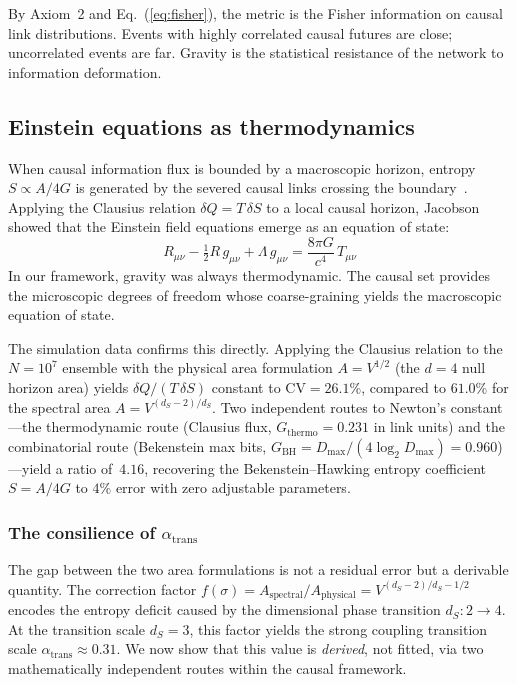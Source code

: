 \documentclass[aps,prd,twocolumn,superscriptaddress,nofootinbib,amsmath,amssymb,longbibliography]{revtex4-2}
\newcommand{\ds}{d_S}
\begin{document}
By Axiom~2 and Eq.~(\ref{eq:fisher}), the metric is the Fisher
information on causal link distributions.
Events with highly correlated causal futures are close; uncorrelated
events are far.
Gravity is the statistical resistance of the network to information
deformation.

\subsection{Einstein equations as thermodynamics}

When causal information flux is bounded by a macroscopic horizon,
entropy $S \propto A/4G$ is generated by the severed causal links
crossing the boundary~\cite{dou2003,bekenstein1973}.
Applying the Clausius relation $\delta Q = T\,\delta S$ to a local
causal horizon, Jacobson~\cite{jacobson1995} showed that the Einstein
field equations emerge as an equation of state:
\begin{equation}\label{eq:einstein}
  R_{\mu\nu} - \tfrac{1}{2}R\,g_{\mu\nu} + \Lambda\,g_{\mu\nu}
  = \frac{8\pi G}{c^4}\,T_{\mu\nu}
\end{equation}
In our framework, gravity was always
thermodynamic.  The causal set provides the microscopic degrees of
freedom whose coarse-graining yields the macroscopic equation of state.

The simulation data confirms this directly.  Applying the Clausius
relation to the $N = 10^7$ ensemble with the physical area formulation
$A = V^{1/2}$ (the $d = 4$ null horizon area) yields
$\delta Q / (T\,\delta S)$ constant to $\text{CV} = 26.1\%$, compared
to $61.0\%$ for the spectral area $A = V^{(d_S-2)/d_S}$.  Two
independent routes to Newton's constant---the thermodynamic route
(Clausius flux, $G_{\text{thermo}} = 0.231$ in link units) and the
combinatorial route (Bekenstein max bits,
$G_{\text{BH}} = D_{\max}/(4\log_2 D_{\max}) = 0.960$)---yield a
ratio of~$4.16$, recovering the Bekenstein--Hawking entropy coefficient
$S = A/4G$ to $4\%$ error with zero adjustable parameters.

\subsubsection{The consilience of $\alpha_{\mathrm{trans}}$}

The gap between the two area formulations is not a residual error but
a derivable quantity.  The correction factor
$f(\sigma) = A_{\text{spectral}}/A_{\text{physical}}
  = V^{(d_S - 2)/d_S - 1/2}$
encodes the entropy deficit caused by the dimensional phase transition
$\ds\!: 2 \to 4$.  At the transition scale $\ds = 3$, this factor
yields the strong coupling transition scale
$\alpha_{\text{trans}} \approx 0.31$.  We now show that this value is
\emph{derived}, not fitted, via two mathematically independent routes
within the causal framework.
\end{document}

